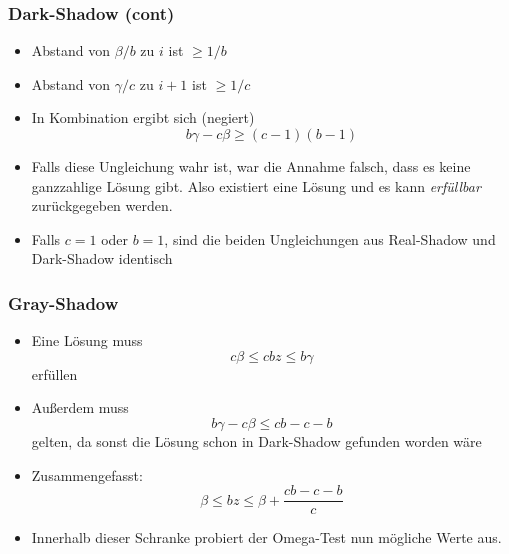 \documentclass[hyperref={pdfpagelabels=false}]{beamer}
\begin{document}
\begin{frame}
	\frametitle{Dark-Shadow (cont)}
	\begin{itemize}
		\item Abstand von $\beta/b$ zu $i$ ist $\geq 1/b$
		\item Abstand von $\gamma/c$ zu $i+1$ ist $\geq 1/c$
		\item In Kombination ergibt sich (negiert)
			\[ b\gamma - c\beta \geq (c-1)(b-1) \]
		\item Falls diese Ungleichung wahr ist, war die Annahme falsch, dass es keine ganzzahlige Lösung gibt. Also existiert eine Lösung und es kann \emph{erfüllbar} zurückgegeben werden.
		\item Falls $c=1$ oder $b=1$, sind die beiden Ungleichungen aus Real-Shadow und Dark-Shadow identisch
	\end{itemize}
\end{frame}
\begin{frame}
	\frametitle{Gray-Shadow}
	\begin{itemize}
		\item Eine Lösung muss
			\[ c\beta \leq cbz \leq b\gamma \]
			erfüllen
		\item Außerdem muss 
			\[ b\gamma - c\beta \leq cb - c - b \]
			gelten, da sonst die Lösung schon in Dark-Shadow gefunden worden wäre
		\item Zusammengefasst:
			\[ \beta \leq bz \leq \beta + \frac{cb - c - b}{c} \]
		\item Innerhalb dieser Schranke probiert der Omega-Test nun mögliche Werte aus.
	\end{itemize}
\end{frame}
\end{document}

